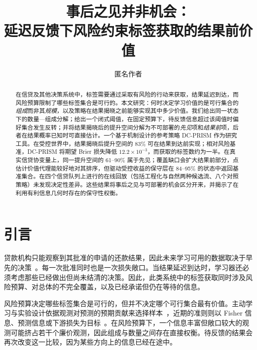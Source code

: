 \documentclass[runningheads]{llncs}
\begin{document}
\title{事后之见并非机会：\\延迟反馈下风险约束标签获取的结果前价值}
\author{匿名作者}
\maketitle
\begin{abstract}
在信贷及其他决策系统中，标签需要通过采取有风险的行动来获取，结果延迟到达，而风险预算限制了哪些标签集合是可行的。本文研究：何时决定学习价值的是可行集合的\emph{组成}而非其\emph{规模}，以及策略在结果揭晓之前能够实现其中多少价值。我们给出同一状态下的数量—组成分解；给出一个闭式阈值，在固定预算下，待反馈信息超过该阈值时偏好集合发生反转；并将结果揭晓后的提升空间分解为不可部署的\emph{先见}项和\emph{结果前}项，后者在结果概率已知时可直接估计。一个基于机制设计的参考策略 DC-PRISM 作为研究工具。在受控世界中，结果揭晓后提升空间的 83\% 可在结果到达前实现；相对风险基准，DC-PRISM 将期望 Brier 损失降低 $12.2\times10^{-3}$，而获取的标签数约为一半。在真实信贷协变量上，同一提升空间的 61--90\% 属于先见；覆盖缺口会扩大结果前部分，点估计价值代理能较好地对其排序，但驱动受控收益的保守层在 84--95\% 的状态中返回基准集合。在四个信贷队列上进行的在线回放（包括工程化与自然两种候选流、八个对照策略）未发现决定性差异。这些结果将事后之见与可部署的机会区分开来，并揭示了在利用有利信息几何时存在的保守性权衡。
\end{abstract}

\section{引言}
\label{sec:intro}
贷款机构只能观察到其批准的申请的还款结果，因此未来学习可用的数据取决于早先的决策~\cite{lakkaraju2017selective,wei2021selective}。每一次批准同时也是一次损失敞口。当结果延迟到达时，学习器还必须考虑那些已经做出但尚未结清的决策。因此，此类系统中的标签获取同时涉及风险预算、对总体的不完全覆盖，以及已经承诺但仍在等待的信息。

风险预算决定哪些标签集合是可行的，但并不决定哪个可行集合最有价值。主动学习与实验设计依据观测对预测的预期贡献来选择样本~\cite{cohn1996active,yu2006transductive,settles2009active}，近期的准则则以 Fisher 信息、预测信息或下游损失为目标~\cite{ash2021fishing,bickfordsmith2023prediction,huang2026loss}。在风险预算下，一个信息丰富但敞口较大的观测可能挤占若干个廉价观测，因此组成与数量之间存在直接权衡。待反馈的结果会再次改变这一比较，因为某些方向上的信息已经在途中。
\end{document}

